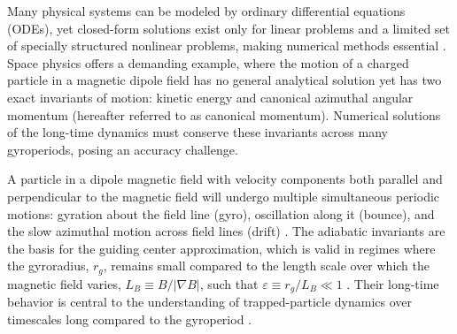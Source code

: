 \documentclass[draft]{agujournal2019}
\begin{document}
Many physical systems can be modeled by ordinary differential equations (ODEs), yet closed-form solutions exist only for linear problems and a limited set of specially structured nonlinear problems, making numerical methods essential \cite{Chapra2021}. Space physics offers a demanding example, where the motion of a charged particle in a magnetic dipole field has no general analytical solution \cite{DragtFinn1976} yet has two exact invariants of motion: kinetic energy and canonical azimuthal angular momentum (hereafter referred to as canonical momentum). Numerical solutions of the long-time dynamics must conserve these invariants across many gyroperiods, posing an accuracy challenge. 


A particle in a dipole magnetic field with velocity components both parallel and perpendicular to the magnetic field will undergo multiple simultaneous periodic motions: gyration about the field line (gyro), oscillation along it (bounce), and the slow azimuthal motion across field lines (drift) \cite{Northrop1963, Dragt1965, Walt1994}. The adiabatic invariants are the basis for the guiding center approximation, which is valid in regimes where the gyroradius, $r_g$, remains small compared to the length scale over which the magnetic field varies, $L_B \equiv {B}/{|\nabla B|}$, such that $\varepsilon \equiv r_g/L_B \ll 1$ \cite{Northrop1963}. Their long-time behavior is central to the understanding of trapped-particle dynamics over timescales long compared to the gyroperiod \cite{DragtFinn1976}.
\end{document}
